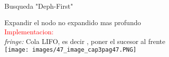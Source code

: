 \begin{frame}{Busqueda "Deph-First"}
    
    Expandir el nodo no expandido mas profundo
    \\\textcolor{red}{\large{Implementacion:}}
    \\\qquad\qquad\textit{fringe:} Cola LIFO, es decir , poner el sucesor al frente
    \\
    \centering
    \texttt{[image: images/47\_image\_cap3pag47.PNG]}
    
\end{frame}
 